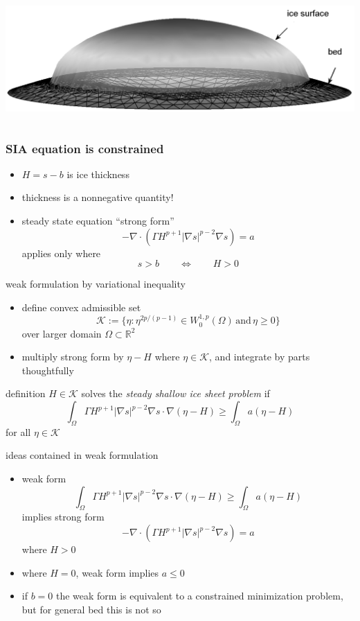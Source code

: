 \documentclass[hide notes,intlimits]{beamer}
\newcommand{\RR}{\mathbb{R}}
\newcommand{\Kcal}{\mathcal{K}}
\newcommand{\Div}{\nabla\cdot}
\newcommand{\grad}{\nabla}
\begin{document}
\begin{frame}
\begin{columns}
\begin{column}{0.55\textwidth}
\begin{center}
\vspace{10mm}
\includegraphics[width=1.05\textwidth]{capnonflatobs}
\end{center}
\end{column}
\end{columns}
\end{frame}


\begin{frame}
  \frametitle{SIA equation is constrained} 
\begin{itemize}
\item $H=s-b$ is ice thickness
\item thickness is a nonnegative quantity!
\item steady state equation ``strong form''
  $$-\Div \left(\Gamma H^{p+1} |\nabla s|^{p-2} \nabla s  \right) =  a$$
applies only where
  $$s>b \qquad \iff \qquad H > 0$$
\end{itemize}
\end{frame}


\begin{frame}{weak formulation by variational inequality} 
\begin{itemize}
\item define convex admissible set
  $$\Kcal := \{\eta : \eta^{2p/(p-1)} \in W^{1,p}_0 (\Omega) \,\text{and}\, \eta \ge 0\}$$
over larger domain $\Omega \subset \RR^2$
\item multiply strong form by $\eta-H$ where $\eta\in \Kcal$, and integrate by parts thoughtfully
\end{itemize}
\begin{block}{definition} 
$H \in \Kcal$ solves the \emph{steady shallow ice sheet problem} if
  $$\int_{\Omega}  \Gamma H^{p+1} |\grad s|^{p-2} \grad s \cdot \grad(\eta - H)  
\ge \int_{\Omega} a (\eta - H)$$
for all $\eta \in \Kcal$
\end{block}
\end{frame}


\begin{frame}{ideas contained in weak formulation} 
\begin{itemize}
\item weak form
  $$\int_{\Omega}  \Gamma H^{p+1} |\grad s|^{p-2} \grad s \cdot \grad(\eta - H)  
\ge \int_{\Omega} a (\eta - H)$$
implies strong form
  $$-\Div \left(\Gamma H^{p+1} |\nabla s|^{p-2} \nabla s  \right) =  a$$
where $H>0$
\item where $H=0$, weak form implies $a \le 0$
\item if $b=0$ the weak form is equivalent to a constrained minimization problem, but for general bed this is not so
\end{itemize}
\end{frame}
\end{document}
